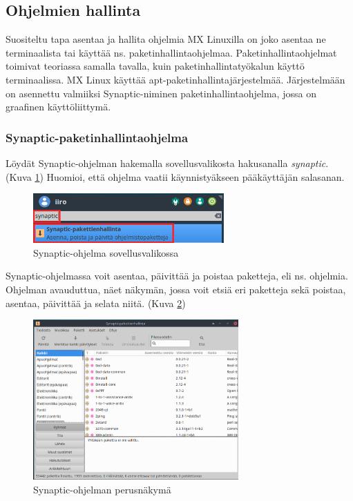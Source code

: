 \documentclass[a4paper, 12pt, finnish]{article}
\begin{document}
\subsection{Ohjelmien hallinta}
Suositeltu tapa asentaa ja hallita ohjelmia MX Linuxilla on joko asentaa ne terminaalista tai käyttää ns. paketinhallintaohjelmaa.
Paketinhallintaohjelmat toimivat teoriassa samalla tavalla, kuin paketinhallintatyökalun käyttö terminaalissa. MX Linux käyttää apt-paketinhallintajärjestelmää. Järjestelmään on asennettu valmiiksi Synaptic-niminen paketinhallintaohjelma, jossa on graafinen käyttöliittymä. 

\clearpage
\subsubsection{Synaptic-paketinhallintaohjelma}
Löydät Synaptic-ohjelman hakemalla sovellusvalikosta hakusanalla \textit{synaptic}.
(Kuva \ref{fig:synaptichaku})
Huomioi, että ohjelma vaatii käynnistyäkseen pääkäyttäjän salasanan.

\begin{figure}[htpb]
    \begin{center}
        \includegraphics[width=0.65\textwidth]{ymparisto/synaptic_haku}
        \caption{Synaptic-ohjelma sovellusvalikossa}
        \label{fig:synaptichaku}
    \end{center}
\end{figure}

Synaptic-ohjelmassa voit asentaa, päivittää ja poistaa paketteja, eli ns. ohjelmia. Ohjelman avauduttua, näet näkymän, jossa voit etsiä eri paketteja sekä poistaa, asentaa, päivittää ja selata niitä. (Kuva \ref{fig:syn_nak})

\begin{figure}[htpb]
    \begin{center}
        \includegraphics[width=0.7\textwidth]{ymparisto/synaptic_nakyma}
        \caption{Synaptic-ohjelman perusnäkymä}
        \label{fig:syn_nak}
    \end{center}
\end{figure}
\end{document}
